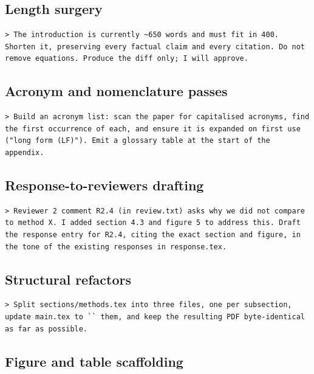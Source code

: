 \subsection{Length surgery}

\begin{lstlisting}[style=prompt]
> The introduction is currently ~650 words and must fit in 400. Shorten it, preserving every factual claim and every citation. Do not remove equations. Produce the diff only; I will approve.
\end{lstlisting}

\subsection{Acronym and nomenclature passes}

\begin{lstlisting}[style=prompt]
> Build an acronym list: scan the paper for capitalised acronyms, find the first occurrence of each, and ensure it is expanded on first use ("long form (LF)"). Emit a glossary table at the start of the appendix.
\end{lstlisting}

\subsection{Response-to-reviewers drafting}

\begin{lstlisting}[style=prompt]
> Reviewer 2 comment R2.4 (in review.txt) asks why we did not compare to method X. I added section 4.3 and figure 5 to address this. Draft the response entry for R2.4, citing the exact section and figure, in the tone of the existing responses in response.tex.
\end{lstlisting}

\subsection{Structural refactors}

\begin{lstlisting}[style=prompt]
> Split sections/methods.tex into three files, one per subsection, update main.tex to `` them, and keep the resulting PDF byte-identical as far as possible.
\end{lstlisting}

\subsection{Figure and table scaffolding}

